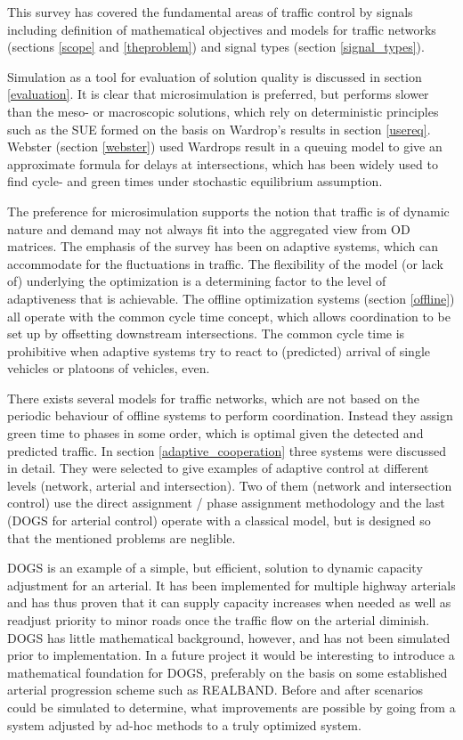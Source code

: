 \label{conclusion}
This survey has covered the fundamental areas of traffic control by signals including definition of mathematical objectives and models for traffic networks (sections \ref{scope} and \ref{theproblem}) and signal types (section \ref{signal_types}). 

Simulation as a tool for evaluation of solution quality is discussed in section \ref{evaluation}. It is clear that microsimulation is preferred, but performs slower than the meso- or macroscopic solutions, which rely on deterministic principles such as the SUE formed on the basis on Wardrop's results in section \ref{usereq}. Webster (section \ref{webster}) used Wardrops result in a queuing model to give an approximate formula for delays at intersections, which has been widely used to find cycle- and green times under stochastic equilibrium assumption.

The preference for microsimulation supports the notion that traffic is of dynamic nature and demand may not always fit into the aggregated view from OD matrices. The emphasis of the survey has been on adaptive systems, which can accommodate for the fluctuations in traffic. 
The flexibility of the model (or lack of) underlying the optimization is a determining factor to the level of adaptiveness that is achievable. The offline optimization systems (section \ref{offline}) all operate with the common cycle time concept, which allows coordination to be set up by offsetting downstream intersections. The common cycle time is prohibitive when adaptive systems try to react to (predicted) arrival of single vehicles or platoons of vehicles, even.

There exists several models for traffic networks, which are not based on the periodic behaviour of offline systems to perform coordination. Instead they assign green time to phases in some order, which is optimal given the detected and predicted traffic. 
In section \ref{adaptive_cooperation} three systems were discussed in detail. They were selected to give examples of adaptive control at different levels (network, arterial and intersection). Two of them (network and intersection control) use the direct assignment / phase assignment methodology and the last (DOGS for arterial control) operate with a classical model, but is designed so that the mentioned problems are neglible.

DOGS is an example of a simple, but efficient, solution to dynamic capacity adjustment for an arterial. It has been implemented for multiple highway arterials and has thus proven that it can supply capacity increases when needed as well as readjust priority to minor roads once the traffic flow on the arterial diminish.
DOGS has little mathematical background, however, and has not been simulated prior to implementation. 
In a future project it would be interesting to introduce a mathematical foundation for DOGS, preferably on the basis on some established arterial progression scheme such as REALBAND. Before and after scenarios could be simulated to determine, what improvements are possible by going from a system adjusted by ad-hoc methods to a truly optimized system.